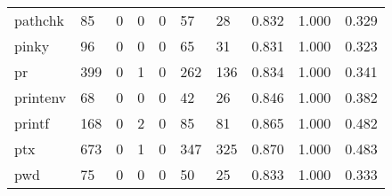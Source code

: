 \begin{longtable}{lp{1.3cm}p{1.3cm}p{1.3cm}p{1.3cm}p{1.3cm}p{1.3cm}p{1.3cm}p{1.3cm}p{1.3cm}}
pathchk   &                     85 &                                             0 &                                            0 &                                           0 &                                           57 &                                         28 &                                0.832 &                                  1.000 &                                0.329 \\
pinky     &                     96 &                                             0 &                                            0 &                                           0 &                                           65 &                                         31 &                                0.831 &                                  1.000 &                                0.323 \\
pr        &                    399 &                                             0 &                                            1 &                                           0 &                                          262 &                                        136 &                                0.834 &                                  1.000 &                                0.341 \\
printenv  &                     68 &                                             0 &                                            0 &                                           0 &                                           42 &                                         26 &                                0.846 &                                  1.000 &                                0.382 \\
printf    &                    168 &                                             0 &                                            2 &                                           0 &                                           85 &                                         81 &                                0.865 &                                  1.000 &                                0.482 \\
ptx       &                    673 &                                             0 &                                            1 &                                           0 &                                          347 &                                        325 &                                0.870 &                                  1.000 &                                0.483 \\
pwd       &                     75 &                                             0 &                                            0 &                                           0 &                                           50 &                                         25 &                                0.833 &                                  1.000 &                                0.333 \\

\end{longtable}
